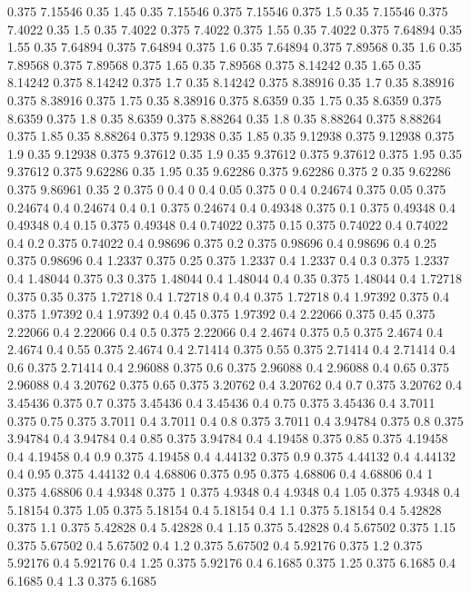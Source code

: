 0.375 7.15546
0.35 1.45
0.35 7.15546
0.375 7.15546
0.375 1.5
0.35 7.15546
0.375 7.4022
0.35 1.5
0.35 7.4022
0.375 7.4022
0.375 1.55
0.35 7.4022
0.375 7.64894
0.35 1.55
0.35 7.64894
0.375 7.64894
0.375 1.6
0.35 7.64894
0.375 7.89568
0.35 1.6
0.35 7.89568
0.375 7.89568
0.375 1.65
0.35 7.89568
0.375 8.14242
0.35 1.65
0.35 8.14242
0.375 8.14242
0.375 1.7
0.35 8.14242
0.375 8.38916
0.35 1.7
0.35 8.38916
0.375 8.38916
0.375 1.75
0.35 8.38916
0.375 8.6359
0.35 1.75
0.35 8.6359
0.375 8.6359
0.375 1.8
0.35 8.6359
0.375 8.88264
0.35 1.8
0.35 8.88264
0.375 8.88264
0.375 1.85
0.35 8.88264
0.375 9.12938
0.35 1.85
0.35 9.12938
0.375 9.12938
0.375 1.9
0.35 9.12938
0.375 9.37612
0.35 1.9
0.35 9.37612
0.375 9.37612
0.375 1.95
0.35 9.37612
0.375 9.62286
0.35 1.95
0.35 9.62286
0.375 9.62286
0.375 2
0.35 9.62286
0.375 9.86961
0.35 2
0.375 0
0.4 0
0.4 0.05
0.375 0
0.4 0.24674
0.375 0.05
0.375 0.24674
0.4 0.24674
0.4 0.1
0.375 0.24674
0.4 0.49348
0.375 0.1
0.375 0.49348
0.4 0.49348
0.4 0.15
0.375 0.49348
0.4 0.74022
0.375 0.15
0.375 0.74022
0.4 0.74022
0.4 0.2
0.375 0.74022
0.4 0.98696
0.375 0.2
0.375 0.98696
0.4 0.98696
0.4 0.25
0.375 0.98696
0.4 1.2337
0.375 0.25
0.375 1.2337
0.4 1.2337
0.4 0.3
0.375 1.2337
0.4 1.48044
0.375 0.3
0.375 1.48044
0.4 1.48044
0.4 0.35
0.375 1.48044
0.4 1.72718
0.375 0.35
0.375 1.72718
0.4 1.72718
0.4 0.4
0.375 1.72718
0.4 1.97392
0.375 0.4
0.375 1.97392
0.4 1.97392
0.4 0.45
0.375 1.97392
0.4 2.22066
0.375 0.45
0.375 2.22066
0.4 2.22066
0.4 0.5
0.375 2.22066
0.4 2.4674
0.375 0.5
0.375 2.4674
0.4 2.4674
0.4 0.55
0.375 2.4674
0.4 2.71414
0.375 0.55
0.375 2.71414
0.4 2.71414
0.4 0.6
0.375 2.71414
0.4 2.96088
0.375 0.6
0.375 2.96088
0.4 2.96088
0.4 0.65
0.375 2.96088
0.4 3.20762
0.375 0.65
0.375 3.20762
0.4 3.20762
0.4 0.7
0.375 3.20762
0.4 3.45436
0.375 0.7
0.375 3.45436
0.4 3.45436
0.4 0.75
0.375 3.45436
0.4 3.7011
0.375 0.75
0.375 3.7011
0.4 3.7011
0.4 0.8
0.375 3.7011
0.4 3.94784
0.375 0.8
0.375 3.94784
0.4 3.94784
0.4 0.85
0.375 3.94784
0.4 4.19458
0.375 0.85
0.375 4.19458
0.4 4.19458
0.4 0.9
0.375 4.19458
0.4 4.44132
0.375 0.9
0.375 4.44132
0.4 4.44132
0.4 0.95
0.375 4.44132
0.4 4.68806
0.375 0.95
0.375 4.68806
0.4 4.68806
0.4 1
0.375 4.68806
0.4 4.9348
0.375 1
0.375 4.9348
0.4 4.9348
0.4 1.05
0.375 4.9348
0.4 5.18154
0.375 1.05
0.375 5.18154
0.4 5.18154
0.4 1.1
0.375 5.18154
0.4 5.42828
0.375 1.1
0.375 5.42828
0.4 5.42828
0.4 1.15
0.375 5.42828
0.4 5.67502
0.375 1.15
0.375 5.67502
0.4 5.67502
0.4 1.2
0.375 5.67502
0.4 5.92176
0.375 1.2
0.375 5.92176
0.4 5.92176
0.4 1.25
0.375 5.92176
0.4 6.1685
0.375 1.25
0.375 6.1685
0.4 6.1685
0.4 1.3
0.375 6.1685
